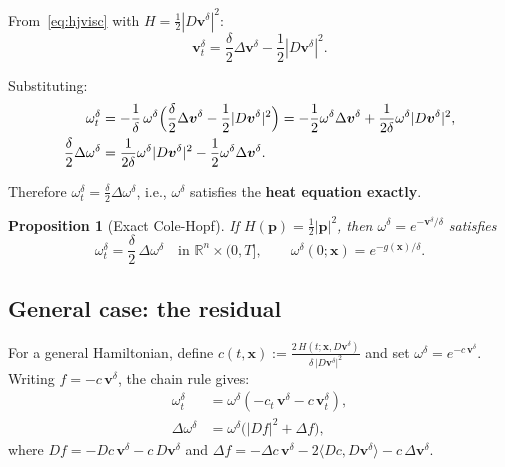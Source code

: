 \documentclass[11pt]{article}
\newtheorem{proposition}{Proposition}
\newcommand{\R}{\mathbb{R}}
\newcommand{\bx}{\bm{x}}
\newcommand{\bv}{\bm{v}}
\newcommand{\bp}{\bm{p}}
\begin{document}
From~\eqref{eq:hjvisc} with $H = \tfrac{1}{2}|D\bv^\delta|^2$:
\[
  \bv_t^\delta = \frac{\delta}{2}\Delta\bv^\delta - \frac{1}{2}|D\bv^\delta|^2.
\]

Substituting:
\begin{align}
  \omega_t^\delta
  &= -\frac{1}{\delta}\,\omega^\delta
     \Bigl(\frac{\delta}{2}\Delta\bv^\delta - \frac{1}{2}|D\bv^\delta|^2\Bigr)
  = -\frac{1}{2}\omega^\delta\Delta\bv^\delta
    + \frac{1}{2\delta}\omega^\delta|D\bv^\delta|^2, \\
  \frac{\delta}{2}\Delta\omega^\delta
  &= \frac{1}{2\delta}\omega^\delta|D\bv^\delta|^2
     - \frac{1}{2}\omega^\delta\Delta\bv^\delta.
\end{align}

Therefore $\omega_t^\delta = \frac{\delta}{2}\Delta\omega^\delta$, i.e.,
$\omega^\delta$ satisfies the \textbf{heat equation exactly}.

\begin{proposition}[Exact Cole-Hopf]\label{prop:exact}
  If $H(\bp) = \frac{1}{2}|\bp|^2$, then $\omega^\delta = e^{-\bv^\delta/\delta}$
  satisfies
  \[
    \omega_t^\delta = \frac{\delta}{2}\,\Delta\omega^\delta
    \quad\text{in } \R^n\times(0,T],
    \qquad
    \omega^\delta(0;\bx) = e^{-g(\bx)/\delta}.
  \]
\end{proposition}

\subsection{General case: the residual}

For a general Hamiltonian, define $c(t,\bx) := \frac{2\,H(t;\bx,D\bv^\delta)}{\delta\,|D\bv^\delta|^2}$
and set $\omega^\delta = e^{-c\,\bv^\delta}$.  Writing $f = -c\,\bv^\delta$,
the chain rule gives:
\begin{align}
  \omega_t^\delta &= \omega^\delta(-c_t\,\bv^\delta - c\,\bv_t^\delta), \label{eq:omega_t_general}\\
  \Delta\omega^\delta &= \omega^\delta\bigl(|Df|^2 + \Delta f\bigr), \label{eq:laplacian_omega}
\end{align}
where $Df = -Dc\,\bv^\delta - c\,D\bv^\delta$ and
$\Delta f = -\Delta c\,\bv^\delta - 2\langle Dc, D\bv^\delta\rangle - c\,\Delta\bv^\delta$.
\end{document}
